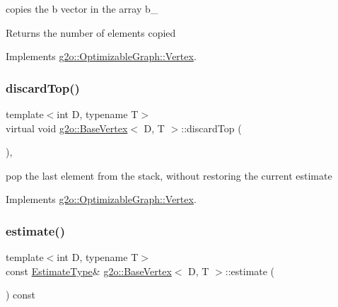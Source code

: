 copies the b vector in the array b\+\_\+ \begin{DoxyReturn}{Returns}
the number of elements copied 
\end{DoxyReturn}


Implements \mbox{\hyperlink{classg2o_1_1_optimizable_graph_1_1_vertex_af544f0050ea6e05950fd6e53931bdf61}{g2o\+::\+Optimizable\+Graph\+::\+Vertex}}.

\mbox{\label{classg2o_1_1_base_vertex_a71729c4d91044bde9bfea4c859b0c02d}} 
\subsubsection{\texorpdfstring{discard\+Top()}{discardTop()}}
{\footnotesize\ttfamily template$<$int D, typename T$>$ \\
virtual void \mbox{\hyperlink{classg2o_1_1_base_vertex}{g2o\+::\+Base\+Vertex}}$<$ D, T $>$\+::discard\+Top (\begin{DoxyParamCaption}{ }\end{DoxyParamCaption})\hspace{0.3cm}{\ttfamily [inline]}, {\ttfamily [virtual]}}



pop the last element from the stack, without restoring the current estimate 



Implements \mbox{\hyperlink{classg2o_1_1_optimizable_graph_1_1_vertex_a9509fb5c333988911312fc3d9187a9c3}{g2o\+::\+Optimizable\+Graph\+::\+Vertex}}.

\mbox{\label{classg2o_1_1_base_vertex_afea20bbcf50eb2a7d9d598b3eae49172}} 
\subsubsection{\texorpdfstring{estimate()}{estimate()}}
{\footnotesize\ttfamily template$<$int D, typename T$>$ \\
const \mbox{\hyperlink{classg2o_1_1_base_vertex_aaffb179a0d591da4769ec7c3fc7f7daa}{Estimate\+Type}}\& \mbox{\hyperlink{classg2o_1_1_base_vertex}{g2o\+::\+Base\+Vertex}}$<$ D, T $>$\+::estimate (\begin{DoxyParamCaption}{ }\end{DoxyParamCaption}) const\hspace{0.3cm}{\ttfamily [inline]}}




